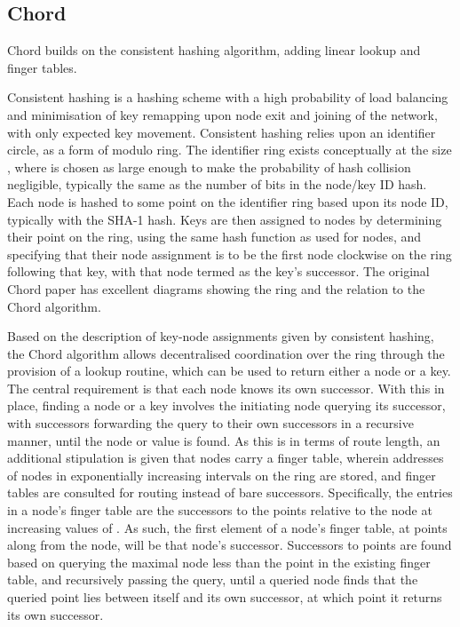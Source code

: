 \subsection{Chord}

Chord builds on the consistent hashing algorithm, adding linear lookup and finger tables\cite{stoica2001chord}.

Consistent hashing is a hashing scheme with a high probability of load balancing and minimisation of key remapping upon node exit and joining of the network, with only  expected key movement\cite{karger1997hash}.
Consistent hashing relies upon an identifier circle, as a form of modulo ring.
The identifier ring exists conceptually at the size , where  is chosen as large enough to make the probability of hash collision negligible, typically the same as the number of bits in the node/key ID hash.
Each node is hashed to some point on the identifier ring based upon its node ID, typically with the SHA-1 hash.
Keys are then assigned to nodes by determining their point on the ring, using the same hash function as used for nodes, and specifying that their node assignment is to be the first node clockwise on the ring following that key, with that node termed as the key's successor.
The original Chord paper has excellent diagrams showing the ring and the relation to the Chord algorithm.

Based on the description of key-node assignments given by consistent hashing, the Chord algorithm allows decentralised coordination over the ring through the provision of a lookup routine, which can be used to return either a node or a key.
The central requirement is that each node knows its own successor.
With this in place, finding a node or a key involves the initiating node querying its successor, with successors forwarding the query to their own successors in a recursive manner, until the node or value is found.
As this is  in terms of route length, an additional stipulation is given that nodes carry a finger table, wherein addresses of nodes in exponentially increasing intervals on the ring are stored, and finger tables are consulted for routing instead of bare successors.
Specifically, the entries in a node's finger table are the successors to the points relative to the node at increasing values of . As such, the first element of a node's finger table, at  points along from the node, will be that node's successor.
Successors to points are found based on querying the maximal node less than the point in the existing finger table, and recursively passing the query, until a queried node finds that the queried point lies between itself and its own successor, at which point it returns its own successor.


